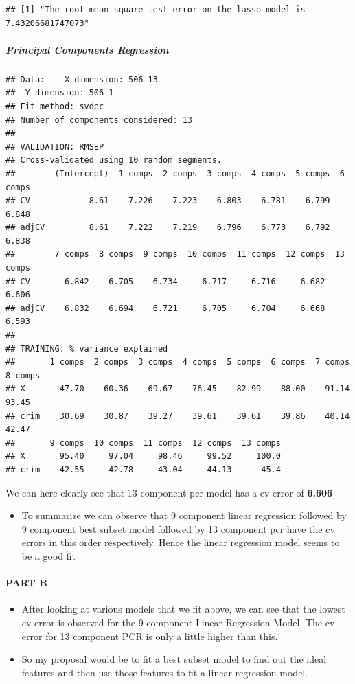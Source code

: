 \documentclass[
]{article}
\providecommand{\tightlist}{%
  \setlength{\itemsep}{0pt}\setlength{\parskip}{0pt}}
\begin{document}
\begin{verbatim}
## [1] "The root mean square test error on the lasso model is 7.43206681747073"
\end{verbatim}

\hypertarget{principal-components-regression}{%
\subparagraph{\texorpdfstring{\textbf{Principal Components
Regression}}{Principal Components Regression}}\label{principal-components-regression}}

\begin{verbatim}
## Data:    X dimension: 506 13 
##  Y dimension: 506 1
## Fit method: svdpc
## Number of components considered: 13
## 
## VALIDATION: RMSEP
## Cross-validated using 10 random segments.
##        (Intercept)  1 comps  2 comps  3 comps  4 comps  5 comps  6 comps
## CV            8.61    7.226    7.223    6.803    6.781    6.799    6.848
## adjCV         8.61    7.222    7.219    6.796    6.773    6.792    6.838
##        7 comps  8 comps  9 comps  10 comps  11 comps  12 comps  13 comps
## CV       6.842    6.705    6.734     6.717     6.716     6.682     6.606
## adjCV    6.832    6.694    6.721     6.705     6.704     6.668     6.593
## 
## TRAINING: % variance explained
##       1 comps  2 comps  3 comps  4 comps  5 comps  6 comps  7 comps  8 comps
## X       47.70    60.36    69.67    76.45    82.99    88.00    91.14    93.45
## crim    30.69    30.87    39.27    39.61    39.61    39.86    40.14    42.47
##       9 comps  10 comps  11 comps  12 comps  13 comps
## X       95.40     97.04     98.46     99.52     100.0
## crim    42.55     42.78     43.04     44.13      45.4
\end{verbatim}

We can here clearly see that 13 component pcr model has a cv error of
\textbf{6.606}

\begin{itemize}
\tightlist
\item
  To summarize we can observe that 9 component linear regression
  followed by 9 component best subset model followed by 13 component pcr
  have the cv errors in this order respectively. Hence the linear
  regression model seems to be a good fit
\end{itemize}

\hypertarget{part-b-3}{%
\paragraph{\texorpdfstring{{PART B}}{PART B}}\label{part-b-3}}

\begin{itemize}
\item
  After looking at various models that we fit above, we can see that the
  lowest cv error is observed for the 9 component Linear Regression
  Model. The cv error for 13 component PCR is only a little higher than
  this.
\item
  So my proposal would be to fit a best subset model to find out the
  ideal features and then use those features to fit a linear regression
  model.
\end{itemize}
\end{document}
